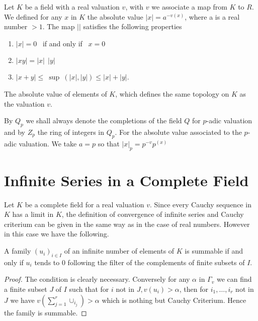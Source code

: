 \begin{remark*}
  Let $K$ be a field with a real valuation $v$, with $v$ we associate
  a map from $K$ to $R$. We defined for any $x$ in $K$ the absolute
  value $|x| = a^{-v(x)}$, where a is a real number $> 1$. The map $|
  |$ satisfies the following properties 
  \begin{enumerate}[(1)]
  \item $|x| = 0$ ~if and only if~ $x = 0$
  \item $|xy| = |x| ~~|y|$
  \item $|x + y| \le ~\sup ~( |x|, |y| ) \le |x| + |y|$.
  \end{enumerate}

  The absolute value of elements of $K$, which defines the same
  topology on $K$ as the valuation $v$. 
\end{remark*}

By $Q_{p}$ we shall always denote the completions of the field $Q$ for
$p$-adic valuation and by $Z_{p}$ the ring of integers in $Q_{p}$. For\pageoriginale
the absolute value associated to the $p$-adic valuation. We take $a=p$
so that $|x|_{p} = p^{-v}p^{(x)}$ 

\section{Infinite Series in a Complete Field}\label{part1:chap1:sec6}

Let $K$ be a complete field for a real valuation $v$. Since every
Cauchy sequence in $K$ has a limit in $K$, the definition of
convergence of infinite series and Cauchy criterium can be given in
the same way as in the case of real numbers. However in this case we
have the following. 

\begin{theorem}\label{part1:chap1:sec6:thm2}%
  A family $(u_{i})_{i \in I}$ of an infinite number of elements of
  $K$ is summable if and only if $u_{i}$ tends to $0$ following the
  filter of the complements of finite subsets of $I$. 
\end{theorem} 

\begin{proof}
  The condition is clearly necessary. Conversely for any $\alpha$ in
  $\Gamma_{v}$ we can find a finite subset $J$ of $I$ such that for
  $i$ not in $J, v(u_{i})>\alpha$, then for $i_{1}, \ldots,  i_{r}$
  not in $J$ we have $v \left(\sum \limits_{j=1}^{r}
  \cup_{i_j}\right)>\alpha$ which is 
  nothing but Cauchy Criterium. Hence the family is summable.
\end{proof} 


